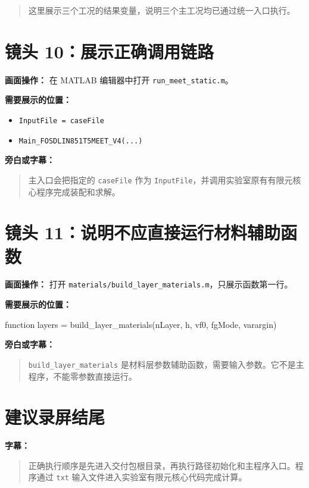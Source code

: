 \documentclass[UTF8,fontset=windows]{ctexart}
\begin{document}
\begin{quote}
这里展示三个工况的结果变量，说明三个主工况均已通过统一入口执行。
\end{quote}

\section{镜头 10：展示正确调用链路}

\textbf{画面操作：} 在 MATLAB 编辑器中打开 \texttt{run\_meet\_static.m}。

\textbf{需要展示的位置：}

\begin{itemize}
  \item \texttt{InputFile = caseFile}
  \item \texttt{Main\_FOSDLIN851T5MEET\_V4(...)}
\end{itemize}

\textbf{旁白或字幕：}

\begin{quote}
主入口会把指定的 \texttt{caseFile} 作为 \texttt{InputFile}，并调用实验室原有有限元核心程序完成装配和求解。
\end{quote}

\section{镜头 11：说明不应直接运行材料辅助函数}

\textbf{画面操作：} 打开 \texttt{materials/build\_layer\_materials.m}，只展示函数第一行。

\textbf{需要展示的位置：}

\begin{code}
function layers = build_layer_materials(nLayer, h, vf0, fgMode, varargin)
\end{code}

\textbf{旁白或字幕：}

\begin{quote}
\texttt{build\_layer\_materials} 是材料层参数辅助函数，需要输入参数。它不是主程序，不能零参数直接运行。
\end{quote}

\section{建议录屏结尾}

\textbf{字幕：}

\begin{quote}
正确执行顺序是先进入交付包根目录，再执行路径初始化和主程序入口。程序通过 \texttt{txt} 输入文件进入实验室有限元核心代码完成计算。
\end{quote}
\end{document}
